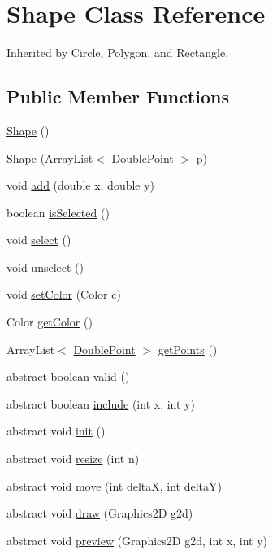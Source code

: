 \hypertarget{class_shape}{}\section{Shape Class Reference}
\label{class_shape}


Inherited by Circle, Polygon, and Rectangle.

\subsection*{Public Member Functions}
\begin{DoxyCompactItemize}
\item 
\hyperlink{class_shape_a3d76b5d801383515923d2f9f800d0d6c}{Shape} ()
\item 
\hyperlink{class_shape_a077daea39f5e67150f6ca1b89b6fc6fd}{Shape} (Array\+List$<$ \hyperlink{class_double_point}{Double\+Point} $>$ p)
\item 
void \hyperlink{class_shape_a32626b5ccab1d89c6724af95121dc125}{add} (double x, double y)
\item 
boolean \hyperlink{class_shape_aa1c3adc5bee37da4d5972965caaec344}{is\+Selected} ()
\item 
void \hyperlink{class_shape_afa9a615b704d91064260ea688dd625f5}{select} ()
\item 
void \hyperlink{class_shape_a5fda5181466313db27d010bbf7bb50a4}{unselect} ()
\item 
void \hyperlink{class_shape_a49e29c1da103be18d279993034de99c6}{set\+Color} (Color c)
\item 
Color \hyperlink{class_shape_a4271dba03c30547a4e0c87418cc07bf8}{get\+Color} ()
\item 
Array\+List$<$ \hyperlink{class_double_point}{Double\+Point} $>$ \hyperlink{class_shape_acced47c85afcddf20b66f1820b86584a}{get\+Points} ()
\item 
abstract boolean \hyperlink{class_shape_a8b64c43dfba956f5586336c460735e1d}{valid} ()
\item 
abstract boolean \hyperlink{class_shape_ada4e95f3d5340e22d9f51db227b16daa}{include} (int x, int y)
\item 
abstract void \hyperlink{class_shape_a2b1385526d1687f2bf2c382aab40cef4}{init} ()
\item 
abstract void \hyperlink{class_shape_a2416754be161196c88e0fa1816e08c0c}{resize} (int n)
\item 
abstract void \hyperlink{class_shape_ac6c07cfa25f740b78af1c212d111fb1e}{move} (int deltaX, int deltaY)
\item 
abstract void \hyperlink{class_shape_a49dd492d72e51ebff5323f12061b970e}{draw} (Graphics2D g2d)
\item 
abstract void \hyperlink{class_shape_aeb76c0ca3c4e20d02d172ba4ce83bd2d}{preview} (Graphics2D g2d, int x, int y)
\end{DoxyCompactItemize}


